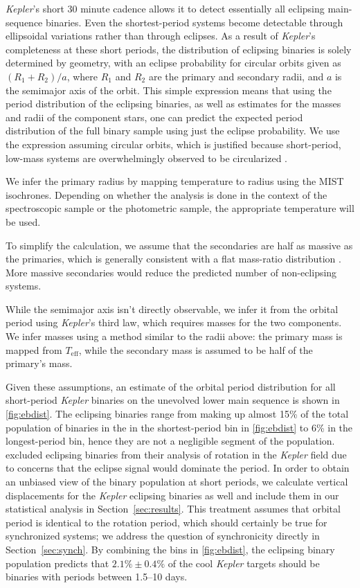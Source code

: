 \documentclass[twocolumn]{aastex6}
\newcommand{\Kepler}{\mbox{\textit{Kepler}}}
\newcommand{\Teff}{\ensuremath{T_{\textrm{eff}}}}
\begin{document}
\Kepler{}'s short 30 minute cadence allows it to detect essentially all eclipsing
main-sequence binaries. Even the shortest-period systems become detectable
through ellipsoidal variations rather than through eclipses. As a result of
\Kepler{}'s completeness at these short periods, the distribution of eclipsing
binaries is solely determined by geometry, with an eclipse probability for circular 
orbits given as \((R_1 + R_2)/a\), where \(R_1\) and \(R_2\) are the primary 
and secondary radii, and \(a\) is the semimajor axis of the orbit. This simple
expression means that using the period distribution of the eclipsing binaries, 
as well as estimates for the masses and radii of the component stars, one can
predict the expected period distribution of the full binary sample using just 
the eclipse probability. We use the expression assuming circular orbits, which 
is justified because short-period, low-mass systems are overwhelmingly observed 
to be circularized \citep{Raghavan10,VanEylen16}. 

We infer the primary radius by mapping temperature to radius using the MIST
isochrones. Depending on whether the analysis is done in the context of the
spectroscopic sample or the photometric sample, the appropriate temperature
will be used.

To simplify the calculation, we assume that the secondaries are half as massive 
as the primaries, which is generally consistent with a flat mass-ratio 
distribution \citep{Raghavan10}. More massive secondaries would reduce the 
predicted number of non-eclipsing systems. 

While the semimajor axis isn't directly observable, we infer it from the 
orbital period using \Kepler{}'s third law, which requires masses for the two
components. We infer masses using a method similar to the radii above: the
primary mass is mapped from \Teff{}, while the secondary mass is assumed to be
half of the primary's mass.

Given these assumptions, an estimate of the orbital period distribution 
for all short-period \Kepler{} binaries on the unevolved lower main sequence is 
shown in \cref{fig:ebdist}. The eclipsing binaries range from making up almost 
15\% of the total population of binaries in the in the shortest-period bin in 
\cref{fig:ebdist} to 6\% in the longest-period bin, hence they are not a 
negligible segment of the population. \citet{McQuillan14} excluded eclipsing 
binaries from their analysis of rotation in the \Kepler{} field due to concerns 
that the eclipse signal would dominate the period. In order to obtain an 
unbiased view of the binary population at short periods, we calculate vertical 
displacements for the \Kepler{} eclipsing binaries as well and include them in 
our statistical analysis in Section~\ref{sec:results}. This treatment assumes that 
orbital period is identical to the rotation period, which should certainly be 
true for synchronized systems; we address the question of synchronicity 
directly in Section~\ref{sec:synch}. By combining the bins in
\cref{fig:ebdist}, the eclipsing binary population predicts that 
\(2.1\% \pm 0.4\%\) of the cool \Kepler{} targets should be binaries with
periods between 1.5--10 days.
\end{document}
